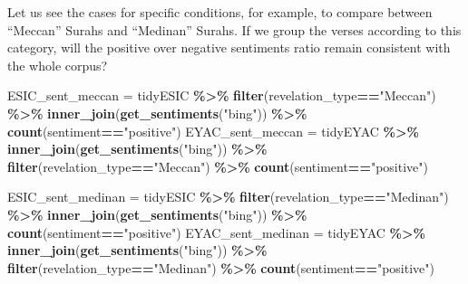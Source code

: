 \documentclass[
]{article}
\newenvironment{Shaded}{\begin{snugshade}}{\end{snugshade}}
\newcommand{\FunctionTok}[1]{\textcolor[rgb]{0.13,0.29,0.53}{\textbf{#1}}}
\newcommand{\NormalTok}[1]{#1}
\newcommand{\OtherTok}[1]{\textcolor[rgb]{0.56,0.35,0.01}{#1}}
\newcommand{\SpecialCharTok}[1]{\textcolor[rgb]{0.81,0.36,0.00}{\textbf{#1}}}
\newcommand{\StringTok}[1]{\textcolor[rgb]{0.31,0.60,0.02}{#1}}
\begin{document}
Let us see the cases for specific conditions, for example, to compare between ``Meccan'' Surahs and ``Medinan'' Surahs. If we group the verses according to this category, will the positive over negative sentiments ratio remain consistent with the whole corpus?

\footnotesize

\begin{Shaded}
\begin{Highlighting}[]
\NormalTok{ESIC\_sent\_meccan }\OtherTok{=}\NormalTok{ tidyESIC }\SpecialCharTok{\%\textgreater{}\%} 
  \FunctionTok{filter}\NormalTok{(revelation\_type}\SpecialCharTok{==}\StringTok{"Meccan"}\NormalTok{) }\SpecialCharTok{\%\textgreater{}\%} 
  \FunctionTok{inner\_join}\NormalTok{(}\FunctionTok{get\_sentiments}\NormalTok{(}\StringTok{"bing"}\NormalTok{)) }\SpecialCharTok{\%\textgreater{}\%} 
  \FunctionTok{count}\NormalTok{(sentiment}\SpecialCharTok{==}\StringTok{"positive"}\NormalTok{)}
\NormalTok{EYAC\_sent\_meccan }\OtherTok{=}\NormalTok{ tidyEYAC }\SpecialCharTok{\%\textgreater{}\%} 
  \FunctionTok{inner\_join}\NormalTok{(}\FunctionTok{get\_sentiments}\NormalTok{(}\StringTok{"bing"}\NormalTok{)) }\SpecialCharTok{\%\textgreater{}\%} 
  \FunctionTok{filter}\NormalTok{(revelation\_type}\SpecialCharTok{==}\StringTok{"Meccan"}\NormalTok{) }\SpecialCharTok{\%\textgreater{}\%} 
  \FunctionTok{count}\NormalTok{(sentiment}\SpecialCharTok{==}\StringTok{"positive"}\NormalTok{)}
\end{Highlighting}
\end{Shaded}

\begin{Shaded}
\begin{Highlighting}[]
\NormalTok{ESIC\_sent\_medinan }\OtherTok{=}\NormalTok{ tidyESIC }\SpecialCharTok{\%\textgreater{}\%} 
  \FunctionTok{filter}\NormalTok{(revelation\_type}\SpecialCharTok{==}\StringTok{"Medinan"}\NormalTok{) }\SpecialCharTok{\%\textgreater{}\%} 
  \FunctionTok{inner\_join}\NormalTok{(}\FunctionTok{get\_sentiments}\NormalTok{(}\StringTok{"bing"}\NormalTok{)) }\SpecialCharTok{\%\textgreater{}\%} 
  \FunctionTok{count}\NormalTok{(sentiment}\SpecialCharTok{==}\StringTok{"positive"}\NormalTok{)}
\NormalTok{EYAC\_sent\_medinan }\OtherTok{=}\NormalTok{ tidyEYAC }\SpecialCharTok{\%\textgreater{}\%} 
  \FunctionTok{inner\_join}\NormalTok{(}\FunctionTok{get\_sentiments}\NormalTok{(}\StringTok{"bing"}\NormalTok{)) }\SpecialCharTok{\%\textgreater{}\%} 
  \FunctionTok{filter}\NormalTok{(revelation\_type}\SpecialCharTok{==}\StringTok{"Medinan"}\NormalTok{) }\SpecialCharTok{\%\textgreater{}\%} 
  \FunctionTok{count}\NormalTok{(sentiment}\SpecialCharTok{==}\StringTok{"positive"}\NormalTok{)}
\end{Highlighting}
\end{Shaded}
\end{document}
